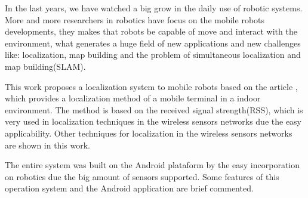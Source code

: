  In the last years, we have watched a big grow in the daily use of robotic systems. 
  More and more researchers in robotics have focus on the mobile robots developments, they makes that 
  robots be capable of move and interact with the environment, what generates a huge field of new 
  applications and new challenges like: localization, map building and the problem of simultaneous
  localization and map building(SLAM).

  This work proposes a localization system to mobile robots based on the article \cite{wifiRadar}, 
  which provides a localization method of a mobile terminal in a indoor environment. The method is 
  based on the received signal strength(RSS), which is very used in localization techniques 
  in the wireless sensors networks due the easy applicability. Other techniques for localization 
  in the wireless sensors networks are shown in this work.
  
  The entire system was built on the Android plataform by the easy incorporation on robotics 
  due the big amount of sensors supported. 
  Some features of this operation system and the Android application are brief commented. 